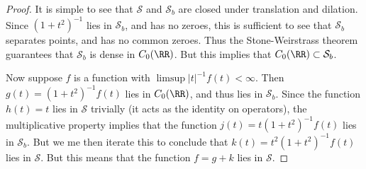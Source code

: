\begin{proof}
    It is simple to see that $\mathcal{S}$ and $\mathcal{S}_b$ are closed under translation and dilation. Since $(1 + t^2)^{-1}$ lies in $\mathcal{S}_b$, and has no zeroes, this is sufficient to see that $\mathcal{S}_b$ separates points, and has no common zeroes. Thus the Stone-Weirstrass theorem guarantees that $\mathcal{S}_b$ is dense in $C_0(\RR)$. But this implies that $C_0(\RR) \subset \mathcal{S}_b$.

    Now suppose $f$ is a function with $\limsup |t|^{-1} f(t) < \infty$. Then $g(t) = (1 + t^2)^{-1} f(t)$ lies in $C_0(\RR)$, and thus lies in $\mathcal{S}_b$. Since the function $h(t) = t$ lies in $\mathcal{S}$ trivially (it acts as the identity on operators), the multiplicative property implies that the function $j(t) = t (1 + t^2)^{-1} f(t)$ lies in $\mathcal{S}_b$. But we me then iterate this to conclude that $k(t) = t^2 (1 + t^2)^{-1} f(t)$ lies in $\mathcal{S}$. But this means that the function $f = g + k$ lies in $\mathcal{S}$.
\end{proof}

